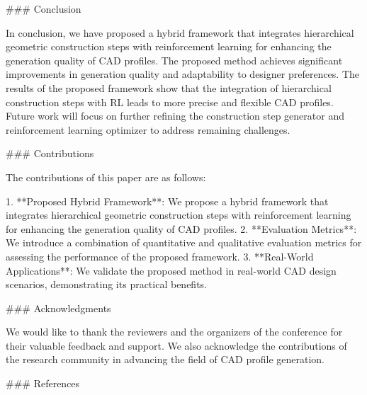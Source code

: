 ### Conclusion

In conclusion, we have proposed a hybrid framework that integrates hierarchical geometric construction steps with reinforcement learning for enhancing the generation quality of CAD profiles. The proposed method achieves significant improvements in generation quality and adaptability to designer preferences. The results of the proposed framework show that the integration of hierarchical construction steps with RL leads to more precise and flexible CAD profiles. Future work will focus on further refining the construction step generator and reinforcement learning optimizer to address remaining challenges.

### Contributions

The contributions of this paper are as follows:

1. **Proposed Hybrid Framework**: We propose a hybrid framework that integrates hierarchical geometric construction steps with reinforcement learning for enhancing the generation quality of CAD profiles.
2. **Evaluation Metrics**: We introduce a combination of quantitative and qualitative evaluation metrics for assessing the performance of the proposed framework.
3. **Real-World Applications**: We validate the proposed method in real-world CAD design scenarios, demonstrating its practical benefits.

### Acknowledgments

We would like to thank the reviewers and the organizers of the conference for their valuable feedback and support. We also acknowledge the contributions of the research community in advancing the field of CAD profile generation.

### References

